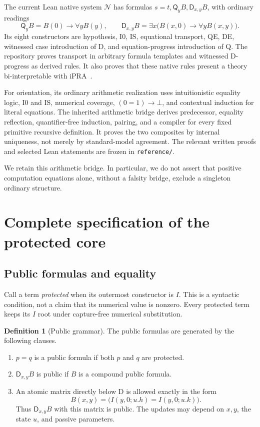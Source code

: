 \documentclass[11pt,letterpaper]{article}
\theoremstyle{definition}\newtheorem{definition}[theorem]{Definition}
\theoremstyle{remark}\newtheorem{remark}[theorem]{Remark}
\newcommand{\D}{\mathsf D}\newcommand{\Q}{\mathsf Q}
\newcommand{\Ncal}{\mathcal N}\newcommand{\Pcal}{\mathcal P}
\newcommand{\file}[1]{{\urlstyle{tt}\nolinkurl{#1}}}
\begin{document}
The current Lean native system \(\Ncal\) has formulas
\(s=t,\Q_yB,\D_{x,y}B\), with ordinary readings
\[
 \Q_yB=B(0)\to\forall yB(y),\qquad
 \D_{x,y}B=\exists x\bigl(B(x,0)\to\forall yB(x,y)\bigr).
\]
Its eight constructors are hypothesis, I0, IS, equational transport,
QE, DE, witnessed case introduction of D, and equation-progress
introduction of Q. The repository proves transport in arbitrary
formula templates and witnessed D-progress as derived rules. It also
proves that these native rules present a theory bi-interpretable with
iPRA~\cite{native,bridge}.

For orientation, its ordinary arithmetic realization uses
intuitionistic equality logic, I0 and IS, numerical coverage,
\((0=1)\to\bot\), and contextual induction for literal equations.
The inherited arithmetic bridge derives predecessor, equality
reflection, quantifier-free induction, pairing, and a compiler for
every fixed primitive recursive definition. It proves the two
composites by internal uniqueness, not merely by standard-model
agreement. The relevant written proofs and selected Lean statements
are frozen in \file{reference/}.

We retain this arithmetic bridge. In particular, we do not assert that
positive computation equations alone, without a falsity bridge,
exclude a singleton ordinary structure.

\section{Complete specification of the protected core}\label{sec:theory}

\subsection{Public formulas and equality}

Call a term \emph{protected} when its outermost constructor is
\(I\). This is a syntactic condition, not a claim that its numerical
value is nonzero. Every protected term keeps its \(I\) root under
capture-free numerical substitution.

\begin{definition}[Public grammar]
The public formulas are generated by the following clauses.
\begin{enumerate}
\item \(p=q\) is a public formula if both \(p\) and \(q\) are protected.
\item \(\D_{x,y}B\) is public if \(B\) is a compound public formula.
\item An atomic matrix directly below D is allowed exactly in the form
\[
 B(x,y)=\bigl(I(y,0;u.h)=I(y,0;u.k)\bigr).
 \tag{Guard}\label{eq:guard}
\]
Thus \(\D_{x,y}B\) with this matrix is public. The updates may depend
on \(x,y\), the state \(u\), and passive parameters.
\end{enumerate}
\end{definition}
\end{document}
